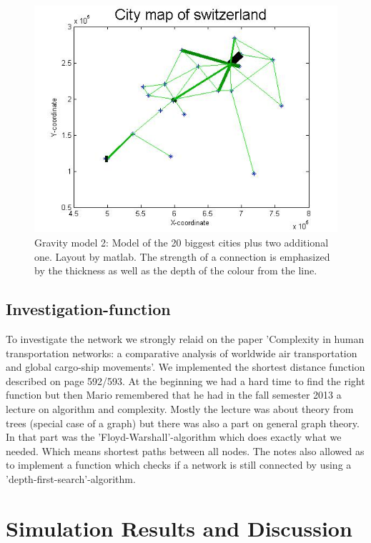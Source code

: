 \documentclass[11pt]{article}
\begin{document}
\begin{figure}
\centering
\includegraphics[scale=0.5]{switzerland_network2}
 \caption{Gravity model 2: Model of the 20 biggest cities plus two additional one. Layout by matlab. The strength of a connection is emphasized by the thickness as well as the depth of the colour from the line.}
\end{figure}

\subsection{Investigation-function}
To investigate the network we strongly relaid on the paper 'Complexity in human transportation networks: a comparative analysis of worldwide air transportation and global cargo-ship movements'.
We implemented the shortest distance function described on page 592/593. At the beginning we had a hard time to find the right function but then Mario remembered that he had in the fall semester 2013 a lecture on algorithm and complexity. Mostly the lecture was about theory from trees (special case of a graph) but there was also a part on general graph theory. In that part was the 'Floyd-Warshall'-algorithm which does exactly what we needed. Which means shortest paths between all nodes.
The notes also allowed as to implement a function which checks if a network is still connected by using a 'depth-first-search'-algorithm.




\section{Simulation Results and Discussion}
\end{document}
